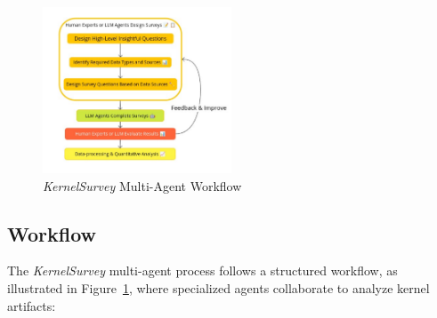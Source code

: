 \begin{figure}[t]
    \centering
    \includegraphics[width=0.5\textwidth]{workflow.pdf}
    \caption{\emph{KernelSurvey} Multi-Agent Workflow}
    \label{fig:workflow}
\end{figure}

\subsection{Workflow}

The \emph{KernelSurvey} multi-agent process follows a structured workflow, as illustrated in Figure~\ref{fig:workflow}, where specialized agents collaborate to analyze kernel artifacts:


